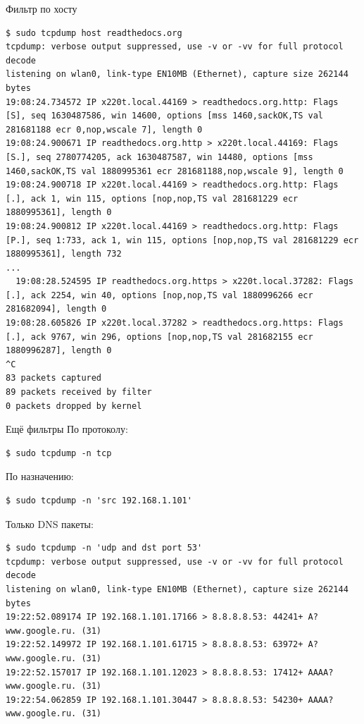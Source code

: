 \begin{frame}[fragile]{Фильтр по хосту}
    \begin{Verbatim}[fontsize=\scriptsize]
$ sudo tcpdump host readthedocs.org
tcpdump: verbose output suppressed, use -v or -vv for full protocol decode
listening on wlan0, link-type EN10MB (Ethernet), capture size 262144 bytes
19:08:24.734572 IP x220t.local.44169 > readthedocs.org.http: Flags [S], seq 1630487586, win 14600, options [mss 1460,sackOK,TS val 281681188 ecr 0,nop,wscale 7], length 0
19:08:24.900671 IP readthedocs.org.http > x220t.local.44169: Flags [S.], seq 2780774205, ack 1630487587, win 14480, options [mss 1460,sackOK,TS val 1880995361 ecr 281681188,nop,wscale 9], length 0
19:08:24.900718 IP x220t.local.44169 > readthedocs.org.http: Flags [.], ack 1, win 115, options [nop,nop,TS val 281681229 ecr 1880995361], length 0
19:08:24.900812 IP x220t.local.44169 > readthedocs.org.http: Flags [P.], seq 1:733, ack 1, win 115, options [nop,nop,TS val 281681229 ecr 1880995361], length 732
...
  19:08:28.524595 IP readthedocs.org.https > x220t.local.37282: Flags [.], ack 2254, win 40, options [nop,nop,TS val 1880996266 ecr 281682094], length 0
19:08:28.605826 IP x220t.local.37282 > readthedocs.org.https: Flags [.], ack 9767, win 296, options [nop,nop,TS val 281682155 ecr 1880996287], length 0
^C
83 packets captured
89 packets received by filter
0 packets dropped by kernel
    \end{Verbatim}
\end{frame}

\begin{frame}[fragile]{Ещё фильтры}
    По протоколу:
    \begin{Verbatim}[fontsize=\scriptsize]
$ sudo tcpdump -n tcp
    \end{Verbatim}
    По назначению:
    \begin{Verbatim}[fontsize=\scriptsize]
$ sudo tcpdump -n 'src 192.168.1.101'
    \end{Verbatim}
    Только DNS пакеты:
    \begin{Verbatim}[fontsize=\scriptsize]
$ sudo tcpdump -n 'udp and dst port 53'
tcpdump: verbose output suppressed, use -v or -vv for full protocol decode
listening on wlan0, link-type EN10MB (Ethernet), capture size 262144 bytes
19:22:52.089174 IP 192.168.1.101.17166 > 8.8.8.8.53: 44241+ A? www.google.ru. (31)
19:22:52.149972 IP 192.168.1.101.61715 > 8.8.8.8.53: 63972+ A? www.google.ru. (31)
19:22:52.157017 IP 192.168.1.101.12023 > 8.8.8.8.53: 17412+ AAAA? www.google.ru. (31)
19:22:54.062859 IP 192.168.1.101.30447 > 8.8.8.8.53: 54230+ AAAA? www.google.ru. (31)
    \end{Verbatim}
\end{frame}

